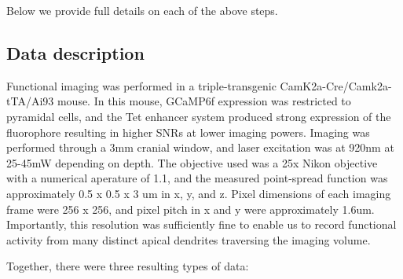 \documentclass[10pt,letterpaper]{article}
\begin{document}



Below we provide full details on each of the above steps.

\subsection{Data description}


Functional imaging was performed in a triple-transgenic CamK2a-Cre/Camk2a-tTA/Ai93 mouse. In this mouse, GCaMP6f expression was restricted to pyramidal cells, and the Tet enhancer system \cite{} produced strong expression of the fluorophore resulting in higher SNRs at lower imaging powers. Imaging was performed through a 3mm cranial window, and laser excitation was at 920nm at 25-45mW depending on depth. The objective used was a 25x Nikon objective with a numerical aperature of 1.1, and the measured point-spread function was  approximately 0.5 x 0.5 x 3 um in x, y, and z. Pixel dimensions of each imaging frame were 256 x 256, and pixel pitch in x and y were approximately 1.6um. Importantly, this resolution was sufficiently fine to enable us to record functional activity from many distinct apical dendrites traversing the imaging volume.  


Together, there were three resulting types of data:
\end{document}
